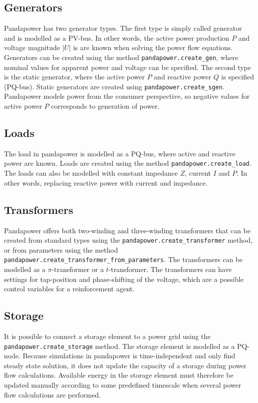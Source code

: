 \documentclass[class=book, crop=false]{standalone}
\begin{document}
\subsection{Generators}
Pandapower has two generator types. The first type is simply called generator and is modelled as a PV-bus. In other words, the active power production $P$ and voltage magnitude $|U|$ is are known when solving the power flow equations. Generators can be created using the method \texttt{pandapower.create\_gen}, where nominal values for apparent power and voltage can be specified. The second type is the static generator, where the active power $P$ and reactive power $Q$ is specified (PQ-bus). Static generators are created using \texttt{pandapower.create\_sgen}. Pandapower models power from the consumer perspective, so negative values for active power $P$ corresponds to generation of power.

\subsection{Loads}
The load in pandapower is modelled as a PQ-bus, where active and reactive power are known. Loads are created using the method \texttt{pandapower.create\_load}. The loads can also be modelled with constant impedance $Z$, current $I$ and $P$. In other words, replacing reactive power with current and impedance.

\subsection{Transformers}
Pandapower offers both two-winding and three-winding transformers that can be created from standard types using the \texttt{pandapower.create\_transformer} method, or from parameters using the method
\texttt{pandapower.create\_transformer\_from\_parameters}. The transformers can be modelled as a $\pi$-transformer or a $t$-transformer. The transformers can have settings for tap-position and phase-shifting of the voltage, which are a possible control variables for a reinforcement agent.  

\subsection{Storage}
It is possible to connect a storage element to a power grid using the \texttt{pandapower.create_storage} method. The storage element is modelled as a PQ-node. Because simulations in pandapower is time-independent and only find steady state solution, it does not update the capacity of a storage during power flow calculations. Available energy in the storage element must therefore be updated manually according to some predefined timescale when several power flow calculations are performed.  
\end{document}
